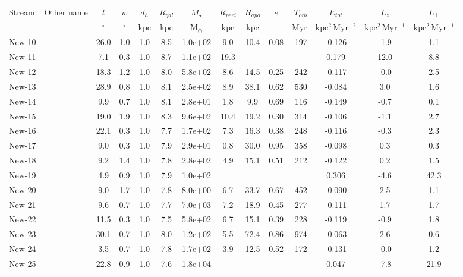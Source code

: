 \centering
\begin{tabular}{llSSSSSSSSrSSS}
\hline\hline
Stream & Other name & $l$ & $w$ & {$d_{h}$} & $R_{gal}$ & $M_\star$ & $R_{peri}$ & $R_{apo}$ & {$e$} & {$T_{orb}$} & {$E_{tot}$} & $L_z$ & $L_\perp$ \\
 &  & $\mathrm{{}^{\circ}}$ & $\mathrm{{}^{\circ}}$ & $\mathrm{kpc}$ & $\mathrm{kpc}$ & $\mathrm{M_{\odot}}$ & $\mathrm{kpc}$ & $\mathrm{kpc}$ &  & $\mathrm{Myr}$ & $\mathrm{kpc^{2}\,Myr^{-2}}$ & $\mathrm{kpc^{2}\,Myr^{-1}}$ & $\mathrm{kpc^{2}\,Myr^{-1}}$ \\
\hline
New-10 &  & 26.0 & 1.0 & 1.0 & 8.5 & 1.0e+02 & 9.0 & 10.4 & 0.08 & 197 & -0.126 & -1.9 & 1.1 \\
New-11 &  & 7.1 & 0.3 & 1.0 & 8.7 & 1.1e+02 & 19.3 &  &  &  & 0.179 & 12.0 & 8.8 \\
New-12 &  & 18.3 & 1.2 & 1.0 & 8.0 & 5.8e+02 & 8.6 & 14.5 & 0.25 & 242 & -0.117 & -0.0 & 2.5 \\
New-13 &  & 28.9 & 0.8 & 1.0 & 8.1 & 2.5e+02 & 8.9 & 38.1 & 0.62 & 530 & -0.084 & 3.0 & 1.6 \\
New-14 &  & 9.9 & 0.7 & 1.0 & 8.1 & 2.8e+01 & 1.8 & 9.9 & 0.69 & 116 & -0.149 & -0.7 & 0.1 \\
New-15 &  & 19.0 & 1.9 & 1.0 & 8.3 & 9.6e+02 & 10.4 & 19.2 & 0.30 & 314 & -0.106 & -1.1 & 2.7 \\
New-16 &  & 22.1 & 0.3 & 1.0 & 7.7 & 1.7e+02 & 7.3 & 16.3 & 0.38 & 248 & -0.116 & -0.3 & 2.3 \\
New-17 &  & 9.0 & 0.3 & 1.0 & 7.9 & 2.9e+01 & 0.8 & 30.0 & 0.95 & 358 & -0.098 & 0.3 & 0.3 \\
New-18 &  & 9.2 & 1.4 & 1.0 & 7.8 & 2.8e+02 & 4.9 & 15.1 & 0.51 & 212 & -0.122 & 0.2 & 1.5 \\
New-19 &  & 4.9 & 0.9 & 1.0 & 7.9 & 1.0e+02 &  &  &  &  & 0.306 & -4.6 & 42.3 \\
New-20 &  & 9.0 & 1.7 & 1.0 & 7.8 & 8.0e+00 & 6.7 & 33.7 & 0.67 & 452 & -0.090 & 2.5 & 1.1 \\
New-21 &  & 9.6 & 0.7 & 1.0 & 7.7 & 7.0e+03 & 7.2 & 18.9 & 0.45 & 277 & -0.111 & 1.7 & 1.7 \\
New-22 &  & 11.5 & 0.3 & 1.0 & 7.5 & 5.8e+02 & 6.7 & 15.1 & 0.39 & 228 & -0.119 & -0.9 & 1.8 \\
New-23 &  & 30.1 & 0.7 & 1.0 & 8.0 & 1.2e+02 & 5.5 & 72.4 & 0.86 & 974 & -0.063 & 2.6 & 0.6 \\
New-24 &  & 3.5 & 0.7 & 1.0 & 7.8 & 1.7e+02 & 3.9 & 12.5 & 0.52 & 172 & -0.131 & -0.0 & 1.2 \\
New-25 &  & 22.8 & 0.9 & 1.0 & 7.6 & 1.8e+04 &  &  &  &  & 0.047 & -7.8 & 21.9 \\

\end{tabular}
